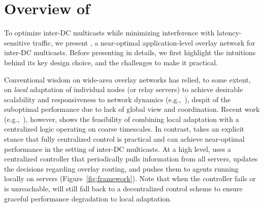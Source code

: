 \section{Overview of \name}
\label{sec:overview}

To optimize inter-DC multicasts while minimizing
interference with latency-sensitive traffic, we present {\em \name},
a near-optimal application-level overlay network for 
inter-DC multicasts.
Before presenting \name in details,
we first highlight the intuitions behind its key
design choice, and the challenges to make it practical.







Conventional wisdom on wide-area overlay networks
has relied, to some extent, 
on {\em local} adaptation of individual
nodes (or relay servers) to achieve desirable scalability
and responsiveness to network dynamics (e.g.,~\cite{Andreev2013Designing,Repantis2010Scaling,Huang2014A}),
despit of the suboptimal performance due to
lack of global view and coordination.
Recent work (e.g.,~\cite{mukerjee2014enabling}), however,
shows the feasibility of combining 
local adaptation with a centralized logic operating
on coarse timescales.
In contrast, \name takes an explicit stance that
fully centralized control is practical and 
can achieve near-optimal performance in
the setting of inter-DC multicasts.
At a high level, 
\name uses a centralized controller that periodically pulls
information from all servers, updates the decisions regarding overlay
routing, and pushes them to agents running locally on servers 
(Figure~\ref{fig:framework}).
Note that when the controller fails or is unreachable,
\name will still fall back to a decentralized control scheme
to ensure graceful performance degradation to 
local adaptation.

